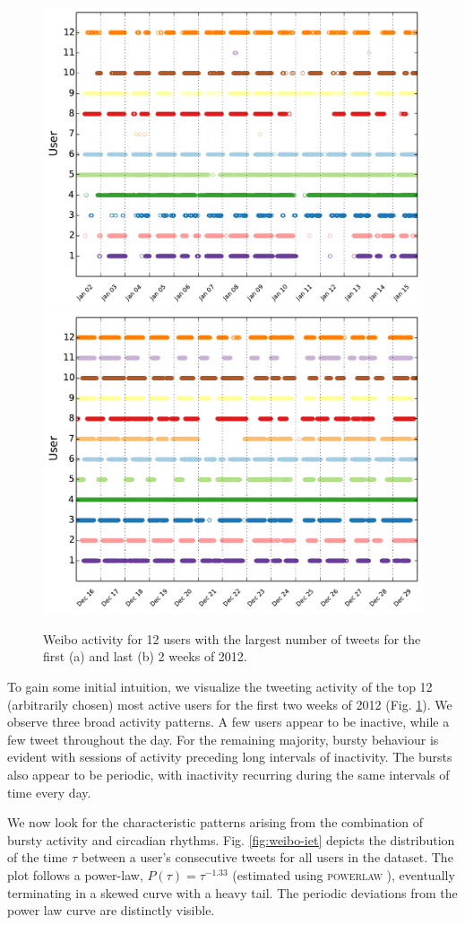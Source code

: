 \documentclass[onecolumn, 12 pt, doublespace, fullpage, letterpaper]{report}
\begin{document}
\begin{figure}
        \includegraphics[width=0.5\linewidth]{12users_first2weeks}
        \includegraphics[width=0.5\linewidth]{12users_last2weeks}
    \caption[Weibo activity in 2012.]{Weibo activity for 12 users with the largest number of tweets for the first (a) and last (b) 2 weeks of 2012.}
    \label{fig:weibo-activity}
\end{figure}

To gain some initial intuition, we visualize the tweeting activity of the top 12 (arbitrarily chosen) most active users for the first two weeks of 2012 (Fig. \ref{fig:weibo-activity}). We observe three broad activity patterns. A few users appear to be inactive, while a few tweet throughout the day. For the remaining majority, bursty behaviour is evident with sessions of activity preceding long intervals of inactivity. The bursts also appear to be periodic, with inactivity recurring during the same intervals of time every day.

We now look for the characteristic patterns arising from the combination of bursty activity and circadian rhythms. Fig. \ref{fig:weibo-iet} depicts the distribution of the time $\tau$ between a user's consecutive tweets for all users in the dataset. The plot follows a power-law, $P(\tau) = \tau^{-1.33}$ (estimated using \textsc{powerlaw} \cite{alstott2014powerlaw}), eventually terminating in a skewed curve with a heavy tail. The periodic deviations from the power law curve are distinctly visible.
\end{document}
